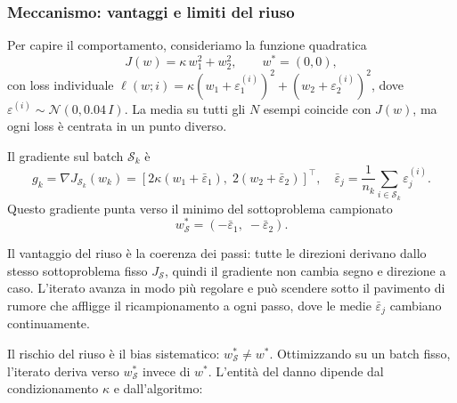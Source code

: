 \documentclass[a4paper,12pt]{article}
\numberwithin{equation}{section}
\numberwithin{figure}{section}
\numberwithin{table}{section}
\begin{document}
\subsubsection{Meccanismo: vantaggi e limiti del riuso}\label{app:riuso-meccanismo}

Per capire il comportamento, consideriamo la funzione quadratica
\[
J(w) = \kappa\, w_1^2 + w_2^2, \qquad w^* = (0,0),
\]
con loss individuale $\ell(w; i) = \kappa(w_1 + \varepsilon_1^{(i)})^2 +
(w_2 + \varepsilon_2^{(i)})^2$, dove $\varepsilon^{(i)} \sim \mathcal{N}(0,
0.04\,I)$. La media su tutti gli $N$ esempi coincide con $J(w)$, ma ogni loss
è centrata in un punto diverso.

Il gradiente sul batch $\mathcal{S}_k$ è
\[
g_k = \nabla J_{\mathcal{S}_k}(w_k)
= \left[2\kappa\!\left(w_1 + \bar\varepsilon_1\right),\;
        2\!\left(w_2 + \bar\varepsilon_2\right)\right]^\top,
\quad \bar\varepsilon_j = \frac{1}{n_k}\sum_{i\in\mathcal{S}_k}\varepsilon_j^{(i)}.
\]
Questo gradiente punta verso il minimo del sottoproblema campionato
\[
w^*_{\mathcal{S}} = (-\bar\varepsilon_1,\; -\bar\varepsilon_2).
\]

Il vantaggio del riuso è la coerenza dei passi: tutte le
direzioni derivano dallo stesso sottoproblema fisso $J_{\mathcal{S}}$,
quindi il gradiente non cambia segno e direzione a caso. L'iterato avanza
in modo più regolare e può scendere sotto il pavimento di rumore
che affligge il ricampionamento a ogni passo, dove le medie $\bar\varepsilon_j$
cambiano continuamente.

Il rischio del riuso è il bias sistematico: $w^*_{\mathcal{S}}
\neq w^*$. Ottimizzando su un batch fisso, l'iterato deriva verso
$w^*_{\mathcal{S}}$ invece di $w^*$. L'entità del danno dipende dal
condizionamento $\kappa$ e dall'algoritmo:
\end{document}
